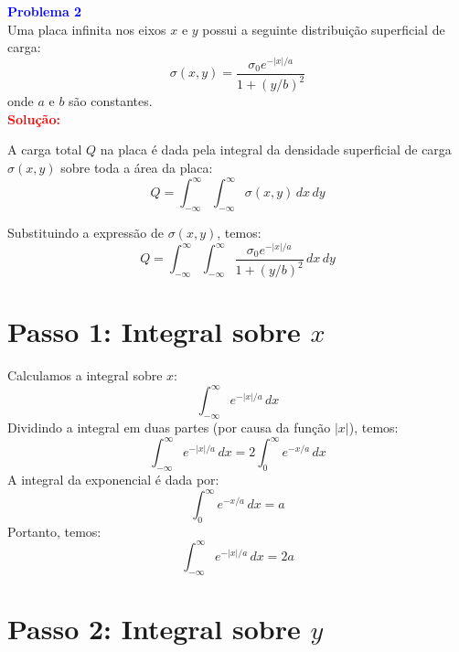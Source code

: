 \documentclass[a4paper,12pt]{article}
\begin{document}
\newpage 

\begin{flushleft}
\textbf{\textcolor{blue}{\Large Problema 2}}\\
Uma placa infinita nos eixos \(x\) e \(y\) possui a seguinte distribuição superficial de carga:
\begin{equation}
\sigma(x,y) = \frac{\sigma_0 e^{-|x|/a}}{1 + (y/b)^2}
\end{equation}
onde \(a\) e \(b\) são constantes. \\

\textcolor{red}{\textbf{Solução:}}\\
\end{flushleft}



A carga total \(Q\) na placa é dada pela integral da densidade superficial de carga \(\sigma(x, y)\) sobre toda a área da placa:
\begin{equation}
Q = \int_{-\infty}^{\infty} \int_{-\infty}^{\infty} \sigma(x, y) \, dx \, dy
\end{equation}

Substituindo a expressão de \(\sigma(x, y)\), temos:
\begin{equation}
Q = \int_{-\infty}^{\infty} \int_{-\infty}^{\infty} \frac{\sigma_0 e^{-|x|/a}}{1 + (y/b)^2} \, dx \, dy
\end{equation}

\section*{Passo 1: Integral sobre \(x\)}

Calculamos a integral sobre \(x\):
\begin{equation}
\int_{-\infty}^{\infty} e^{-|x|/a} \, dx
\end{equation}
Dividindo a integral em duas partes (por causa da função \(|x|\)), temos:
\begin{equation}
\int_{-\infty}^{\infty} e^{-|x|/a} \, dx = 2 \int_0^{\infty} e^{-x/a} \, dx
\end{equation}
A integral da exponencial é dada por:
\begin{equation}
\int_0^{\infty} e^{-x/a} \, dx = a
\end{equation}
Portanto, temos:
\begin{equation}
\int_{-\infty}^{\infty} e^{-|x|/a} \, dx = 2a
\end{equation}

\section*{Passo 2: Integral sobre \(y\)}
\end{document}
